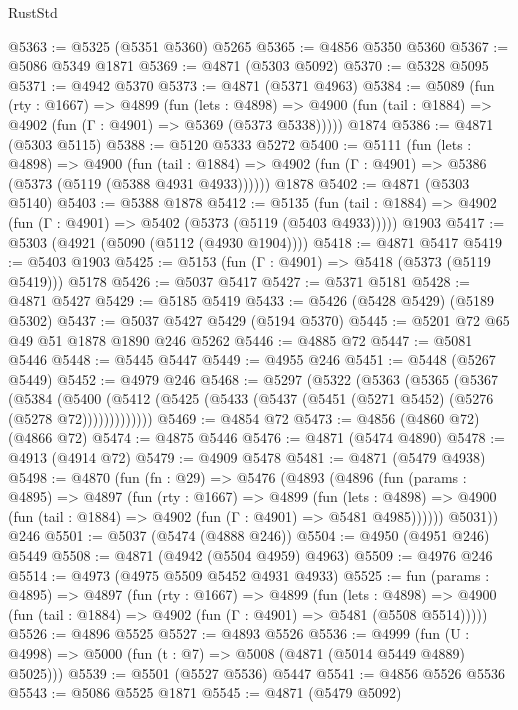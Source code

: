 \begin{lexlean}{RustStd}
\begin{coremodule}
@5363 := @5325 (@5351 @5360) @5265
@5365 := @4856 @5350 @5360
@5367 := @5086 @5349 @1871
@5369 := @4871 (@5303 @5092)
@5370 := @5328 @5095
@5371 := @4942 @5370
@5373 := @4871 (@5371 @4963)
@5384 := @5089
    (fun (rty : @1667) =>
    @4899
      (fun (lets : @4898) =>
      @4900 (fun (tail : @1884) => @4902 (fun (Γ : @4901) => @5369 (@5373 @5338)))))
    @1874
@5386 := @4871 (@5303 @5115)
@5388 := @5120 @5333 @5272
@5400 := @5111
    (fun (lets : @4898) =>
    @4900
      (fun (tail : @1884) => @4902 (fun (Γ : @4901) => @5386 (@5373 (@5119 (@5388 @4931 @4933))))))
    @1878
@5402 := @4871 (@5303 @5140)
@5403 := @5388 @1878
@5412 := @5135
    (fun (tail : @1884) => @4902 (fun (Γ : @4901) => @5402 (@5373 (@5119 (@5403 @4933)))))
    @1903
@5417 := @5303 (@4921 (@5090 (@5112 (@4930 @1904))))
@5418 := @4871 @5417
@5419 := @5403 @1903
@5425 := @5153 (fun (Γ : @4901) => @5418 (@5373 (@5119 @5419))) @5178
@5426 := @5037 @5417
@5427 := @5371 @5181
@5428 := @4871 @5427
@5429 := @5185 @5419
@5433 := @5426 (@5428 @5429) (@5189 @5302)
@5437 := @5037 @5427 @5429 (@5194 @5370)
@5445 := @5201 @72 @65 @49 @51 @1878 @1890 @246 @5262
@5446 := @4885 @72
@5447 := @5081 @5446
@5448 := @5445 @5447
@5449 := @4955 @246
@5451 := @5448 (@5267 @5449)
@5452 := @4979 @246
@5468 := @5297
    (@5322
      (@5363
        (@5365
          (@5367
            (@5384
              (@5400 (@5412 (@5425 (@5433 (@5437 (@5451 (@5271 @5452) (@5276 (@5278 @72)))))))))))))
@5469 := @4854 @72
@5473 := @4856 (@4860 @72) (@4866 @72)
@5474 := @4875 @5446
@5476 := @4871 (@5474 @4890)
@5478 := @4913 (@4914 @72)
@5479 := @4909 @5478
@5481 := @4871 (@5479 @4938)
@5498 := @4870
    (fun (fn : @29) =>
    @5476
      (@4893
        (@4896
          (fun (params : @4895) =>
          @4897
            (fun (rty : @1667) =>
            @4899
              (fun (lets : @4898) =>
              @4900 (fun (tail : @1884) => @4902 (fun (Γ : @4901) => @5481 @4985))))))
        @5031))
    @246
@5501 := @5037 (@5474 (@4888 @246))
@5504 := @4950 (@4951 @246) @5449
@5508 := @4871 (@4942 (@5504 @4959) @4963)
@5509 := @4976 @246
@5514 := @4973 (@4975 @5509 @5452 @4931 @4933)
@5525 := fun (params : @4895) =>
  @4897
    (fun (rty : @1667) =>
    @4899
      (fun (lets : @4898) =>
      @4900 (fun (tail : @1884) => @4902 (fun (Γ : @4901) => @5481 (@5508 @5514)))))
@5526 := @4896 @5525
@5527 := @4893 @5526
@5536 := @4999 (fun (U : @4998) => @5000 (fun (t : @7) => @5008 (@4871 (@5014 @5449 @4889) @5025)))
@5539 := @5501 (@5527 @5536) @5447
@5541 := @4856 @5526 @5536
@5543 := @5086 @5525 @1871
@5545 := @4871 (@5479 @5092)

\end{coremodule}
\end{lexlean}
